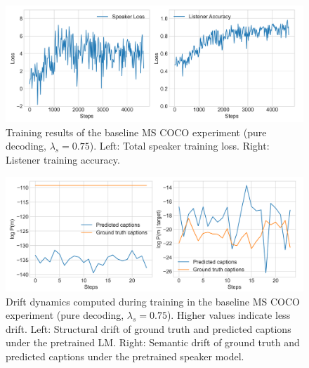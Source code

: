 \begin{figure}[h]
	\centering
	\includegraphics[width=\linewidth]{images/coco_refgame_4000_pure_075_random.png}
	\caption{Training results of the baseline MS COCO experiment (pure decoding, $\lambda_s = 0.75$). Left: Total speaker training loss. Right: Listener training accuracy.}
	\label{fig:coco_baseline_075_speaker_loss_listener_acc}
\end{figure}

\begin{figure}[h]
	\centering
	\includegraphics[width=\linewidth]{images/coco_structural_semantic_drift_4000_pure_075_random.png}
	\caption{Drift dynamics computed during training in the baseline MS COCO experiment (pure decoding, $\lambda_s = 0.75$). Higher values indicate less drift. Left: Structural drift of ground truth and predicted captions under the pretrained LM. Right: Semantic drift of ground truth and predicted captions under the pretrained speaker model.\protect\footnotemark}
	\label{fig:coco_baseline_075_str_drift}
\end{figure}

